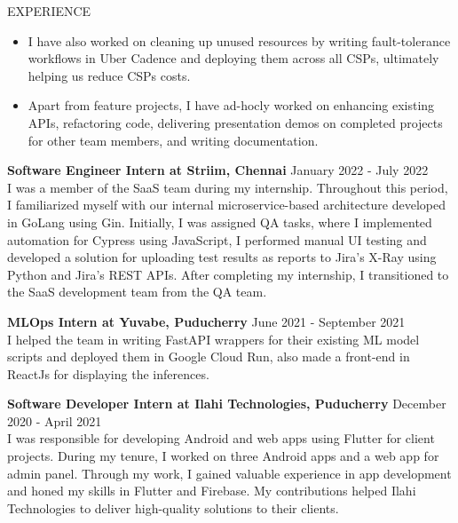 \documentclass{template}
\begin{document}
\begin{rSection}{EXPERIENCE}
\begin{itemize}
    \item I have also worked on cleaning up unused resources by writing fault-tolerance workflows in Uber Cadence and deploying them across all CSPs, ultimately helping us reduce CSPs costs.

    \item Apart from feature projects, I have ad-hocly worked on enhancing existing APIs, refactoring code, delivering presentation demos on completed projects for other team members, and writing documentation.
\end{itemize}

\textbf{Software Engineer Intern at Striim, Chennai} \hfill January 2022 - July 2022 \\
I was a member of the SaaS team during my internship. Throughout this period, I familiarized myself with our internal microservice-based architecture developed in GoLang using Gin. Initially, I was assigned QA tasks, where I implemented automation for Cypress using JavaScript, I performed manual UI testing and developed a solution for uploading test results as reports to Jira's X-Ray using Python and Jira's REST APIs. After completing my internship, I transitioned to the SaaS development team from the QA team. 


\textbf{MLOps Intern at Yuvabe, Puducherry} \hfill June 2021 - September 2021 \\
I helped the team in writing FastAPI wrappers for their existing ML model scripts and deployed them in Google Cloud Run, also made a front-end in ReactJs for displaying the inferences.

\textbf{Software Developer Intern at Ilahi Technologies, Puducherry} \hfill December 2020 - April 2021 \\
I was responsible for developing Android and web apps using Flutter for client projects. During my tenure, I worked on three Android apps and a web app for admin panel. Through my work, I gained valuable experience in app development and honed my skills in Flutter and Firebase. My contributions helped Ilahi Technologies to deliver high-quality solutions to their clients.

\end{rSection} 
\end{document}
